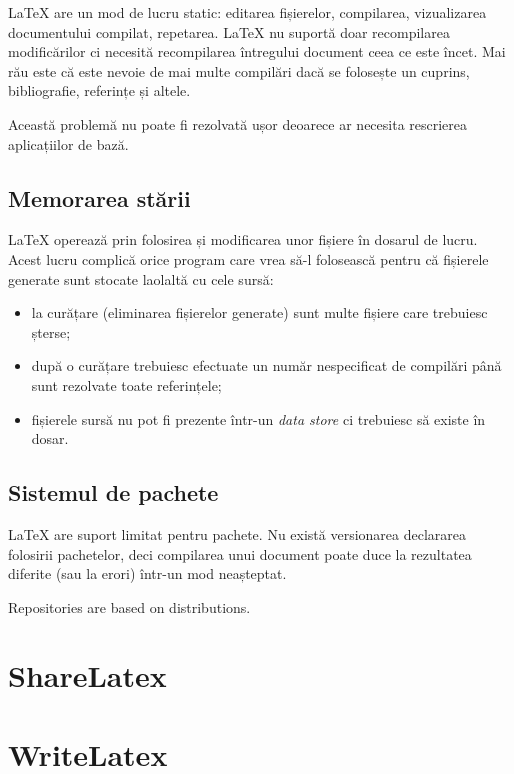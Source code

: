 \documentclass[a4wide,12pt]{report}
\newcommand{\eng}[1]{\emph{#1}} %
\newcommand{\idee}[1]{{\color{red} #1}}
\begin{document}
\LaTeX{} are un mod de lucru static: editarea fișierelor, compilarea,
vizualizarea documentului compilat, repetarea. \LaTeX{} nu suportă doar
recompilarea modificărilor ci necesită recompilarea întregului document ceea ce
este încet. Mai rău este că este nevoie de mai multe compilări dacă se folosește
un cuprins, bibliografie, referințe și altele.

Această problemă nu poate fi rezolvată ușor deoarece ar necesita rescrierea
aplicațiilor de bază.

\subsection{Memorarea stării}
\label{memstasub}

\LaTeX{} operează prin folosirea și modificarea unor fișiere în dosarul de
lucru. Acest lucru complică orice program care vrea să-l folosească pentru că
fișierele generate sunt stocate laolaltă cu cele sursă:

\begin{itemize}

\item la curățare (eliminarea fișierelor generate) sunt multe fișiere care
trebuiesc șterse;

\item după o curățare trebuiesc efectuate un număr nespecificat de compilări
până sunt rezolvate toate referințele;

\item fișierele sursă nu pot fi prezente într-un \eng{data store} ci trebuiesc
să existe în dosar.

\end{itemize}

\subsection{Sistemul de pachete}

\LaTeX{} are suport limitat pentru pachete. Nu există versionarea declararea
folosirii pachetelor, deci compilarea unui document poate duce la rezultatea
diferite (sau la erori) într-un mod neașteptat.

\idee{Repositories are based on distributions.}

\section{ShareLatex}

\section{WriteLatex}
\end{document}

